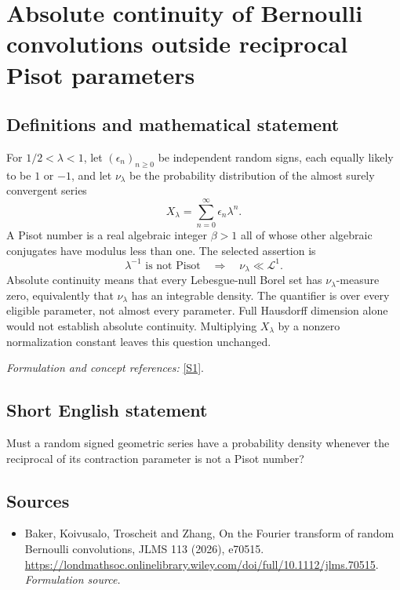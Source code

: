 \documentclass[11pt]{article}
\begin{document}
\section*{\texorpdfstring{Absolute continuity of Bernoulli convolutions outside reciprocal Pisot parameters}{Absolute continuity of Bernoulli convolutions outside reciprocal Pisot parameters}}\label{426}
\subsection{Definitions and mathematical statement}
For $1/2<\lambda<1$, let $(\epsilon_n)_{n\ge0}$ be independent random signs, each equally likely to be $1$ or $-1$, and let $\nu_\lambda$ be the probability distribution of the almost surely convergent series
\[
 X_\lambda=\sum_{n=0}^{\infty}\epsilon_n\lambda^n.
\]
A Pisot number is a real algebraic integer $\beta>1$ all of whose other algebraic conjugates have modulus less than one. The selected assertion is
\[
 \lambda^{-1}\text{ is not Pisot}\quad\Longrightarrow\quad
 \nu_\lambda\ll\mathcal L^1.
\]
Absolute continuity means that every Lebesgue-null Borel set has $\nu_\lambda$-measure zero, equivalently that $\nu_\lambda$ has an integrable density. The quantifier is over every eligible parameter, not almost every parameter. Full Hausdorff dimension alone would not establish absolute continuity. Multiplying $X_\lambda$ by a nonzero normalization constant leaves this question unchanged.
\par\smallskip\textit{Formulation and concept references:} \href{https://londmathsoc.onlinelibrary.wiley.com/doi/full/10.1112/jlms.70515}{[S1]}.

\subsection{Short English statement}
Must a random signed geometric series have a probability density whenever the reciprocal of its contraction parameter is not a Pisot number?
\subsection{Sources}
\begin{itemize}
\item[S1]Baker, Koivusalo, Troscheit and Zhang, On the Fourier transform of random Bernoulli convolutions, JLMS 113 (2026), e70515.
\url{https://londmathsoc.onlinelibrary.wiley.com/doi/full/10.1112/jlms.70515}.
\textit{Formulation source.}
\end{itemize}
\end{document}
